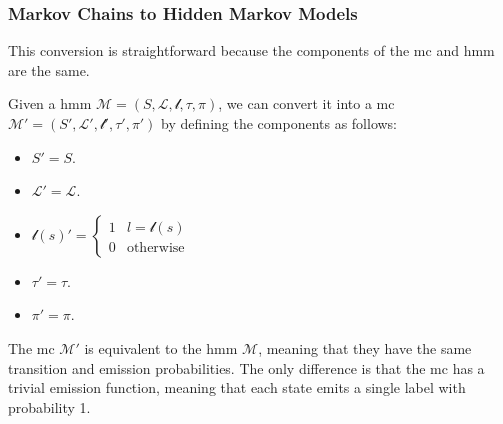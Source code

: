 \subsubsection{Markov Chains to Hidden Markov Models}\label{subsec:mc2hmm}
This conversion is straightforward because the components of the \gls{mc} and \gls{hmm} are the same.
\begin{definition}
    Given a \gls{hmm} $\mathcal{M} = (S, \mathcal{L}, \mathscr{l}, \tau,  \pi)$, we can convert it into a \gls{mc} $\mathcal{M}' = (S', \mathcal{L}', \mathscr{l}', \tau',  \pi')$ by defining the components as follows:
    \begin{itemize}
        \item $S' = S$.
        \item $\mathcal{L}' = \mathcal{L}$.
        \item $\mathscr{l}(s)' =  \begin{cases}
                      1 & l=\mathscr{l}(s) \\
                      0 & \text{otherwise}
                  \end{cases}$
        \item $\tau' = \tau$.
        \item $\pi' = \pi$.
    \end{itemize}
\end{definition}
The \gls{mc} $\mathcal{M}'$ is equivalent to the \gls{hmm} $\mathcal{M}$, meaning that they have the same transition and emission probabilities.
The only difference is that the \gls{mc} has a trivial emission function, meaning that each state emits a single label with probability 1.

